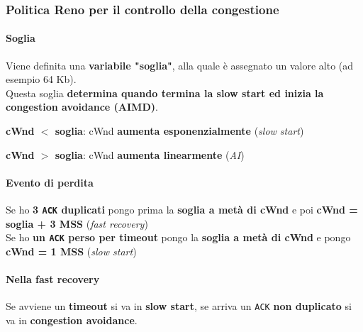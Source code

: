 \documentclass[10pt]{article}
\begin{document}
\subsubsection{Politica Reno per il controllo della congestione}
\paragraph{Soglia} Viene definita una \textbf{variabile "soglia"}, alla quale è assegnato un valore alto (ad esempio 64 Kb).\\
Questa soglia \textbf{determina quando termina la slow start ed inizia la congestion avoidance (AIMD)}.
\begin{list}{}{}
\item \textbf{cWnd $<$ soglia}: cWnd \textbf{aumenta esponenzialmente} (\textit{slow start})
\item \textbf{cWnd $>$ soglia}: cWnd \textbf{aumenta linearmente} (\textit{AI})
\end{list}
\paragraph{Evento di perdita} Se ho \textbf{3 \texttt{ACK} duplicati} pongo prima la \textbf{soglia a metà di cWnd} e poi \textbf{cWnd = soglia + 3 MSS} (\textit{fast recovery})\\
Se ho \textbf{un \texttt{ACK} perso per timeout} pongo la \textbf{soglia a metà di cWnd} e pongo \textbf{cWnd = 1 MSS} (\textit{slow start})
\paragraph{Nella fast recovery} Se avviene un \textbf{timeout} si va in \textbf{slow start}, se arriva un \texttt{ACK} \textbf{non duplicato} si va in \textbf{congestion avoidance}.
\end{document}
